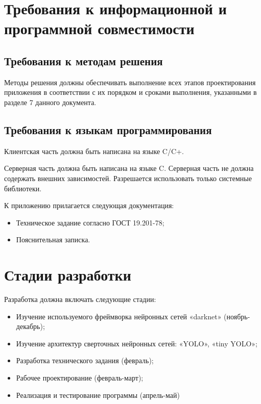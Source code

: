 \documentclass[a4paper,english]{G2-105}
\begin{document}
\section{Требования к информационной и программной совместимости}
\subsection{Требования к методам решения}
\par Методы решения должны обеспечивать выполнение всех этапов проектирования приложения в соответствии с их порядком и сроками выполнения, указанными в разделе 7 данного документа.
\subsection{Требования к языкам программирования}
\par Клиентская часть должна быть написана на языке C/C+.
\par Серверная часть должна быть написана на языке C. Серверная часть не должна содержать внешних зависимостей. Разрешается использовать только системные библиотеки.

\par К приложению прилагается следующая документация:
\begin{itemize}
\item Техническое задание согласно ГОСТ 19.201-78;
\item Пояснительная записка.
\end{itemize}

\section{Стадии разработки}
\par Разработка должна включать следующие стадии:
\begin{itemize}
\item Изучение используемого фреймворка нейронных сетей
«darknet» (ноябрь-декабрь);
\item Изучение архитектур сверточных нейронных сетей: «YOLO»,
«tiny YOLO»;
\item Разработка технического задания (февраль);
\item Рабочее проектирование (февраль-март);
\item Реализация и тестирование программы (апрель-май)
\end{itemize}
\end{document}
